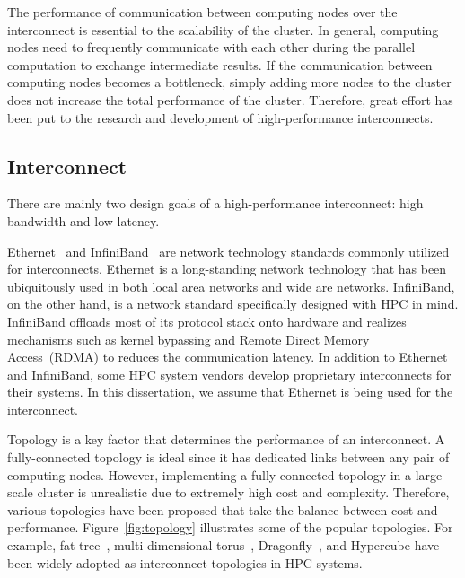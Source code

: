 The performance of communication between computing nodes over the interconnect
is essential to the scalability of the cluster. In general, computing nodes
need to frequently communicate with each other during the parallel computation
to exchange intermediate results. If the communication between computing nodes
becomes a bottleneck, simply adding more nodes to the cluster does not
increase the total performance of the cluster. Therefore, great effort has
been put to the research and development of high-performance interconnects.

\subsection{Interconnect}

There are mainly two design goals of a high-performance interconnect: high
bandwidth and low latency.

Ethernet~\autocite{Trowbridge2007} and InfiniBand~\autocite{Buyya2001} are
network technology standards commonly utilized for interconnects. Ethernet is
a long-standing network technology that has been ubiquitously used in both
local area networks and wide are networks. InfiniBand, on the other hand, is a
network standard specifically designed with HPC in mind. InfiniBand offloads
most of its protocol stack onto hardware and realizes mechanisms such as
kernel bypassing and Remote Direct Memory Access~(RDMA) to reduces the
communication latency. In addition to Ethernet and InfiniBand, some HPC system
vendors develop proprietary interconnects for their systems. In this
dissertation, we assume that Ethernet is being used for the interconnect.

Topology is a key factor that determines the performance of an interconnect.
A fully-connected topology is ideal since it has dedicated links between any
pair of computing nodes. However, implementing a fully-connected topology in a
large scale cluster is unrealistic due to extremely high cost and complexity.
Therefore, various topologies have been proposed that take the balance
between cost and performance. Figure~\ref{fig:topology} illustrates some of
the popular topologies. For example, fat-tree~\autocite{Leiserson1985},
multi-dimensional torus~\autocite{Adiga2005,Ajima2012},
Dragonfly~\autocite{Kim2008}, and Hypercube have been widely adopted as
interconnect topologies in HPC systems.

